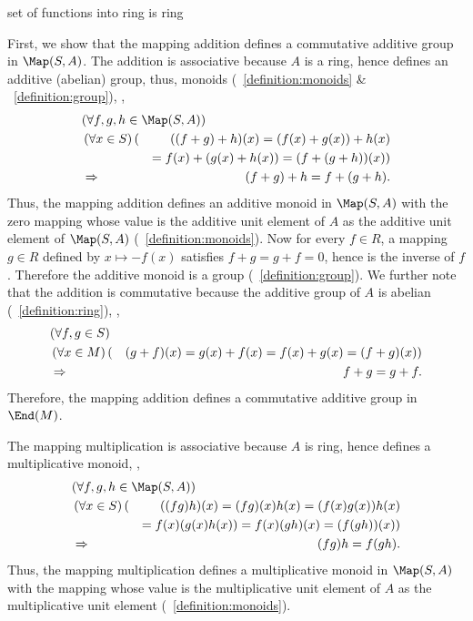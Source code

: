 \documentclass[17pt,landscape]{foils}
\begin{document}
{{{\begin{myproof}{set of functions into ring is ring}
\bit
\item
	First, we show that the mapping addition defines a commutative additive group in $\Map(S,A)$.
	The addition is associative because $A$ is a ring,
	hence defines an additive (abelian) group,
	thus, monoids
	(~\ref{definition:monoids} \& ~\ref{definition:group}),
	\ie,
	\begin{eqnarray*}
		\lefteqn{
		\left(
			\forall f,g,h \in \Map(S,A)
		\right)
		}
		\\
		&
		\left(
			\forall x \in S
		\right)
		(&
			((f+g)+h)(x)
			= (f(x)+g(x)) + h(x)
		\\
		&&
			= f(x)+ (g(x) + h(x))
			= (f+ (g + h))(x)
		)
		\\
		&\Rightarrow&
		(f+g)+h = f+(g+h).
	\end{eqnarray*}
	Thus, the mapping addition defines an additive monoid in $\Map(S,A)$
	with the zero mapping whose value is the additive unit element of $A$
	as the additive unit element of $\Map(S,A)$
	(~\ref{definition:monoids}).
	Now for every $f\in R$,
	a mapping $g\in R$ defined by $x \mapsto -f(x)$
	satisfies $f+g = g+f=0$,
	hence is the inverse of $f$.
	Therefore the additive monoid is a group (~\ref{definition:group}).
	We further note that
	the addition is commutative because the additive group of $A$ is abelian
	(~\ref{definition:ring}),
	\ie,
	\begin{eqnarray*}
		\lefteqn{
		\left(
			\forall f,g \in S
		\right)
		}
		\\
		&
		\left(
			\forall x \in M
		\right)
		(&
			(g+f)(x) = g(x) + f(x) = f(x) + g(x) = (f+g)(x)
		)
		\\
		&\Rightarrow&
		f+g = g+f.
	\end{eqnarray*}
	Therefore, the mapping addition defines a commutative additive group in $\End(M)$.

\item
	The mapping multiplication is associative because
	$A$ is ring,
	hence
	defines a multiplicative monoid,
	\ie,
	\begin{eqnarray*}
		\lefteqn{
		\left(
			\forall f,g,h \in \Map(S,A)
		\right)
		}
		\\
		&
		\left(
			\forall x \in S
		\right)
		(&
			((fg)h)(x)
			= (fg)(x) h(x)
			= (f(x)g(x)) h(x)
		\\
		&&
			= f(x) (g(x) h(x))
			= f(x) (gh)(x)
			= (f (g h))(x)
		)
		\\
		&\Rightarrow&
		(fg)h = f(gh).
	\end{eqnarray*}
	Thus, the mapping multiplication defines a multiplicative monoid in $\Map(S,A)$
	with the mapping whose value is the multiplicative unit element of $A$
	as the multiplicative unit element
	(~\ref{definition:monoids}).


\end{myproof}}}}
\end{document}
